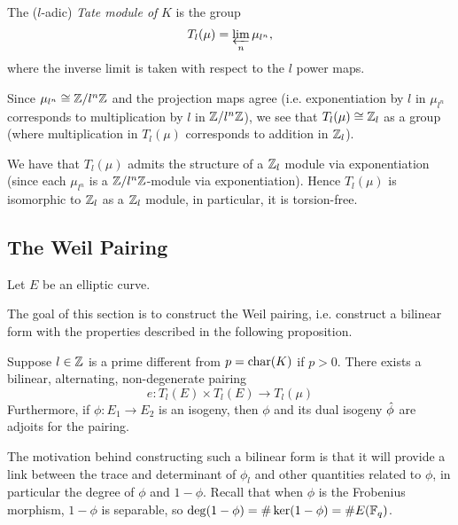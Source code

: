 
\begin{definition}
	The ($l$-adic) \emph{Tate module of} $K$ is the group
	\begin{equation*}
		T_l(\mu) = \varprojlim_n \mu_{l^n},
	\end{equation*}
	where the inverse limit is taken with respect to the $l$
	power maps.
\end{definition}

Since $\mu_{l^n} \cong \mathbb{Z}/l^n\mathbb{Z}$ and the projection maps agree
(i.e. exponentiation by $l$ in $\mu_{l^n}$ corresponds to multiplication
by $l$ in $\mathbb{Z}/l^n\mathbb{Z}$),
we see that $T_l(\mu) \cong \mathbb{Z}_l$
as a group (where multiplication in $T_l(\mu)$ corresponds to addition in
$\mathbb{Z}_l$).

We have that $T_l(\mu)$ admits the structure of a $\mathbb{Z}_l$ module
via exponentiation (since
each $\mu_{l^n}$ is a $\mathbb{Z}/l^n\mathbb{Z}$-module via exponentiation).
Hence $T_l(\mu)$ is isomorphic to $\mathbb{Z}_l$ as a $\mathbb{Z}_l$ module,
in particular, it is torsion-free.

\subsection{The Weil Pairing}

Let $E$ be an elliptic curve. 


The goal of this section is to construct the Weil pairing, i.e. construct
a bilinear form with the properties described in the following proposition.
\begin{proposition}
	\label{prop:weil-pairing}
	Suppose $l \in \mathbb{Z}$ is a prime different from $p = \operatorname{char}(K)$ if $p > 0$.
	There exists a bilinear, alternating, non-degenerate pairing
	\begin{equation*}
		e: T_l(E) \times T_l(E) \to T_l(\mu)	
	\end{equation*}
	Furthermore, if $\phi: E_1 \to E_2$ is an isogeny, then $\phi$ and its
	dual isogeny $\Hat\phi$ are adjoits for the pairing.
\end{proposition}
The motivation behind constructing such a bilinear form is that it will provide
a link between the trace and determinant of $\phi_l$ and other quantities
related to $\phi$, in particular the degree of $\phi$ and $1 - \phi$.
Recall that when $\phi$ is the Frobenius morphism, $1 - \phi$ is separable,
so $\deg(1 - \phi) = \#\ker(1 - \phi) = \#E(\mathbb{F}_q)$.


